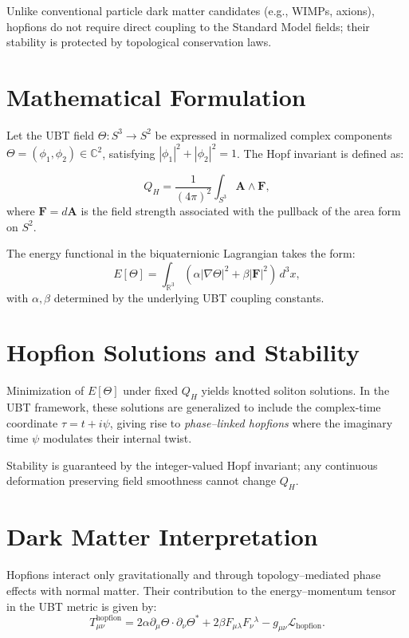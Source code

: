 \documentclass[12pt,a4paper]{article}
\begin{document}
Unlike conventional particle dark matter candidates (e.g., WIMPs, axions), hopfions do not require direct coupling to the Standard Model fields; their stability is protected by topological conservation laws.

\section*{Mathematical Formulation}
Let the UBT field \(\Theta: S^3 \to S^2\) be expressed in normalized complex components \(\Theta = (\phi_1, \phi_2) \in \mathbb{C}^2\), satisfying \(|\phi_1|^2 + |\phi_2|^2 = 1\). The Hopf invariant is defined as:

\begin{equation}
Q_H = \frac{1}{(4\pi)^2} \int_{S^3} \mathbf{A} \wedge \mathbf{F},
\end{equation}
where \(\mathbf{F} = d\mathbf{A}\) is the field strength associated with the pullback of the area form on \(S^2\).

The energy functional in the biquaternionic Lagrangian takes the form:
\begin{equation}
E[\Theta] = \int_{\mathbb{R}^3} \left( \alpha |\nabla \Theta|^2 + \beta |\mathbf{F}|^2 \right) \, d^3x,
\end{equation}
with \(\alpha, \beta\) determined by the underlying UBT coupling constants.

\section*{Hopfion Solutions and Stability}
Minimization of \(E[\Theta]\) under fixed \(Q_H\) yields knotted soliton solutions. In the UBT framework, these solutions are generalized to include the complex-time coordinate \(\tau = t + i\psi\), giving rise to \emph{phase–linked hopfions} where the imaginary time \(\psi\) modulates their internal twist.

Stability is guaranteed by the integer-valued Hopf invariant; any continuous deformation preserving field smoothness cannot change \(Q_H\).

\section*{Dark Matter Interpretation}
Hopfions interact only gravitationally and through topology–mediated phase effects with normal matter. Their contribution to the energy–momentum tensor in the UBT metric is given by:
\begin{equation}
T_{\mu\nu}^{\text{hopfion}} = 2\alpha \partial_\mu \Theta \cdot \partial_\nu \Theta^* + 2\beta F_{\mu\lambda} F_{\nu}{}^\lambda - g_{\mu\nu} \mathcal{L}_{\text{hopfion}}.
\end{equation}
\end{document}

